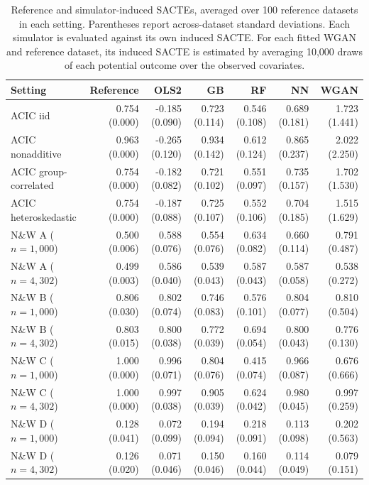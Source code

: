 \begin{table}[!t]
\centering
\caption{Reference and simulator-induced SACTEs, averaged over 100 reference datasets in each setting. Parentheses report across-dataset standard deviations. Each simulator is evaluated against its own induced SACTE. For each fitted WGAN and reference dataset, its induced SACTE is estimated by averaging 10,000 draws of each potential outcome over the observed covariates.}
\label{tab:induced-estimands}
\begin{tabular}{lrrrrrr}
\toprule
Setting & Reference & OLS2 & GB & RF & NN & WGAN \\
\midrule
ACIC iid & 0.754 (0.000) & -0.185 (0.090) & 0.723 (0.114) & 0.546 (0.108) & 0.689 (0.181) & 1.723 (1.441) \\
ACIC nonadditive & 0.963 (0.000) & -0.265 (0.120) & 0.934 (0.142) & 0.612 (0.124) & 0.865 (0.237) & 2.022 (2.250) \\
ACIC group-correlated & 0.754 (0.000) & -0.182 (0.082) & 0.721 (0.102) & 0.551 (0.097) & 0.735 (0.157) & 1.702 (1.530) \\
ACIC heteroskedastic & 0.754 (0.000) & -0.187 (0.088) & 0.725 (0.107) & 0.552 (0.106) & 0.704 (0.185) & 1.515 (1.629) \\
\midrule
N\&W A ($n=1{,}000$) & 0.500 (0.006) & 0.588 (0.076) & 0.554 (0.076) & 0.634 (0.082) & 0.660 (0.114) & 0.791 (0.487) \\
N\&W A ($n=4{,}302$) & 0.499 (0.003) & 0.586 (0.040) & 0.539 (0.043) & 0.587 (0.043) & 0.587 (0.058) & 0.538 (0.272) \\
N\&W B ($n=1{,}000$) & 0.806 (0.030) & 0.802 (0.074) & 0.746 (0.083) & 0.576 (0.101) & 0.804 (0.077) & 0.810 (0.504) \\
N\&W B ($n=4{,}302$) & 0.803 (0.015) & 0.800 (0.038) & 0.772 (0.039) & 0.694 (0.054) & 0.800 (0.043) & 0.776 (0.130) \\
N\&W C ($n=1{,}000$) & 1.000 (0.000) & 0.996 (0.071) & 0.804 (0.076) & 0.415 (0.074) & 0.966 (0.087) & 0.676 (0.666) \\
N\&W C ($n=4{,}302$) & 1.000 (0.000) & 0.997 (0.038) & 0.905 (0.039) & 0.624 (0.042) & 0.980 (0.045) & 0.997 (0.259) \\
N\&W D ($n=1{,}000$) & 0.128 (0.041) & 0.072 (0.099) & 0.194 (0.094) & 0.218 (0.091) & 0.113 (0.098) & 0.202 (0.563) \\
N\&W D ($n=4{,}302$) & 0.126 (0.020) & 0.071 (0.046) & 0.150 (0.046) & 0.160 (0.044) & 0.114 (0.049) & 0.079 (0.151) \\
\bottomrule
\end{tabular}
\end{table}

